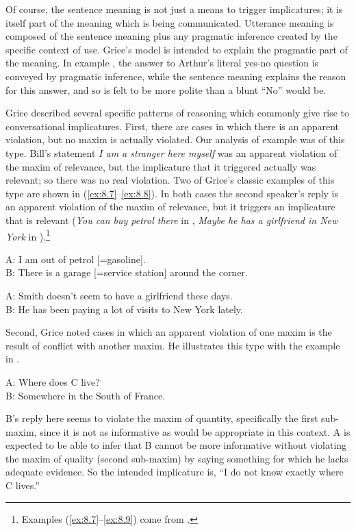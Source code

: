Of course, the sentence meaning is not just a means to trigger implicatures; it is itself part of the meaning which is being communicated. Utterance meaning is composed of the sentence meaning plus any pragmatic inference created by the specific context of use. Grice’s model is intended to explain the pragmatic part of the meaning. In example , the answer to Arthur’s literal yes-no question is conveyed by pragmatic inference, while the sentence meaning explains the reason for this answer, and so is felt to be more polite than a blunt “No” would be.



Grice described several specific patterns of reasoning which commonly give rise to conversational implicatures. First, there are cases in which there is an apparent violation, but no maxim is actually violated. Our analysis of example  was of this type. Bill’s statement \textit{I am a stranger here myself} was an apparent violation of the maxim of relevance, but the implicature that it triggered actually was relevant; so there was no real violation. Two of Grice’s classic examples of this type are shown in (\ref{ex:8.7}--\ref{ex:8.8}). In both cases the second speaker’s reply is an apparent violation of the maxim of relevance, but it triggers an implicature that is relevant (\textit{You can buy petrol there} in , \textit{Maybe he has a girlfriend in New York} in ).\footnote{Examples (\ref{ex:8.7}--\ref{ex:8.9}) come from \citet[51]{Grice1975}.} 


\ea \label{ex:8.7}
A: I am out of petrol [=gasoline].\\
B: There is a garage [=service station] around the corner.
\z

\ea \label{ex:8.8}
A: Smith doesn’t seem to have a girlfriend these days.\\
B: He has been paying a lot of visits to New York lately.
\z


Second, Grice noted cases in which an apparent violation of one maxim is the result of conflict with another maxim. He illustrates this type with the example in . 


\ea \label{ex:8.9}
A: Where does C live?\\
B: Somewhere in the South of France.
\z


B’s reply here seems to violate the maxim of quantity, specifically the first sub-maxim, since it is not as informative as would be appropriate in this context. A is expected to be able to infer that B cannot be more informative without violating the maxim of quality (second sub-maxim) by saying something for which he lacks adequate evidence. So the intended implicature is, “I do not know exactly where C lives.”



